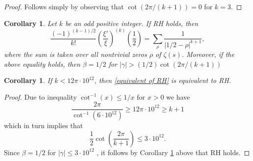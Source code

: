 \documentclass[12pt]{amsart}
\numberwithin{equation}{section}
\theoremstyle{myplain}
\theoremstyle{mydefinition}
\theoremstyle{plain}
\newtheorem{corollary}[theorem]{Corollary}
\theoremstyle{definition}
\renewcommand{\leq}{\leqslant}
\renewcommand{\geq}{\geqslant}
\begin{document}
\begin{proof}
Follows simply by observing that $\cot (2 \pi/(k + 1)) = 0$ for $k = 3$.
\end{proof}



\begin{corollary} \label{main corollary}
Let $k$ be an odd positive integer. If RH holds, then 
\begin{equation} \label{equivalent of RH}
\frac{(-1)^{(k - 1)/2}}{k!} \left( \frac{\xi'}{\xi} \right)^{(k)} \left( \frac{1}{2} \right) = \sum_{\rho} \frac{1}{|1/2 - \rho|^{k + 1}},
\end{equation}
where the sum is taken over all nontrivial zeros $\rho$ of $\zeta(s)$. Moreover, if the above equality holds, then $\beta = 1/2$ for $|\gamma| > (1/2) \cot(2 \pi/(k + 1))$
\end{corollary}

\begin{corollary}
If $k <  12 \pi \cdot 10^{12}$, then \eqref{equivalent of RH} is equivalent to RH.
\end{corollary}

\begin{proof}
Due to inequality $\cot^{-1} (x) \leq 1/x$ for $x > 0$ we have
\[
\frac{2 \pi}{\cot^{-1}(6 \cdot 10^{12})} \geq 12 \pi \cdot 10^{12} \geq k + 1
\]
which in turn implies that
\[
\frac{1}{2} \cot \left(\frac{2 \pi}{k + 1} \right) \leq 3 \cdot 10^{12}.
\]
Since $\beta = 1/2$ for $|\gamma| \leq 3 \cdot 10^{12}$ \cite{platt2021riemann}, it follows by Corollary \ref{main corollary} above that RH holds.
\end{proof}







\end{document}
